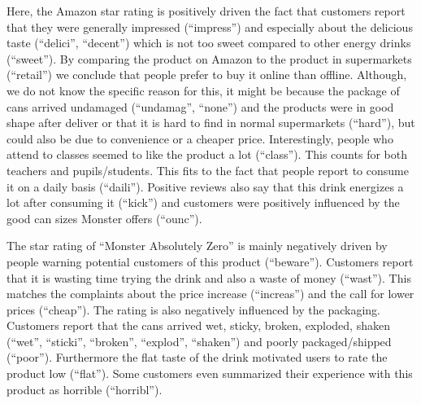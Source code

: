 \documentclass[
]{article}
\begin{document}
Here, the Amazon star rating is positively driven the fact that
customers report that they were generally impressed (``impress'') and
especially about the delicious taste (``delici'', ``decent'') which is
not too sweet compared to other energy drinks (``sweet''). By comparing
the product on Amazon to the product in supermarkets (``retail'') we
conclude that people prefer to buy it online than offline. Although, we
do not know the specific reason for this, it might be because the
package of cans arrived undamaged (``undamag'', ``none'') and the
products were in good shape after deliver or that it is hard to find in
normal supermarkets (``hard''), but could also be due to convenience or
a cheaper price. Interestingly, people who attend to classes seemed to
like the product a lot (``class''). This counts for both teachers and
pupils/students. This fits to the fact that people report to consume it
on a daily basis (``daili''). Positive reviews also say that this drink
energizes a lot after consuming it (``kick'') and customers were
positively influenced by the good can sizes Monster offers (``ounc'').

The star rating of ``Monster Absolutely Zero'' is mainly negatively
driven by people warning potential customers of this product
(``beware''). Customers report that it is wasting time trying the drink
and also a waste of money (``wast''). This matches the complaints about
the price increase (``increas'') and the call for lower prices
(``cheap''). The rating is also negatively influenced by the packaging.
Customers report that the cans arrived wet, sticky, broken, exploded,
shaken (``wet'', ``sticki'', ``broken'', ``explod'', ``shaken'') and
poorly packaged/shipped (``poor''). Furthermore the flat taste of the
drink motivated users to rate the product low (``flat''). Some customers
even summarized their experience with this product as horrible
(``horribl''). \small
\end{document}

